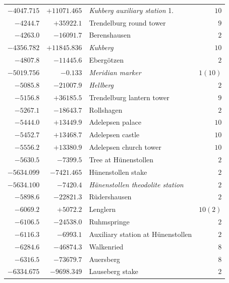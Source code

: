 \begin{center}
\begin{tabular}{r|r|p{170pt}|r}
\(-4047.715\)&\(+11071.465\)&\textit{Kuhberg auxiliary station} 1.&\(10\)\\
\(-4244.7\)&\(+35922.1\)&Trendelburg round tower&\(9\)\\
\(-4263.0\)&\(-16091.7\)&Berenshausen&\(2\)\\
\(-4356.782\)&\(+11845.836\)&\textit{Kuhberg}&\(10\)\\
\(-4807.8\)&\(-11445.6\)&Ebergötzen&\(2\)\\
\(-5019.756\)&\(-0.133\)&\textit{Meridian marker}&\(1(10)\)\\
\(-5085.8\)&\(-21007.9\)&\textit{Hellberg}&\(2\)\\
\(-5156.8\)&\(+36185.5\)&Trendelburg lantern tower&\(9\)\\
\(-5267.1\)&\(-18643.7\)&Rollshagen&\(2\)\\
\(-5444.0\)&\(+13449.9\)&Adelepsen palace&\(10\)\\
\(-5452.7\)&\(+13468.7\)&Adelepsen castle&\(10\)\\
\(-5556.2\)&\(+13380.9\)&Adelepsen church tower&\(10\)\\
\(-5630.5\)&\(-7399.5\)&Tree at Hünenstollen&\(2\)\\
\(-5634.099\)&\(-7421.465\)&Hünenstollen stake&\(2\)\\
\(-5634.100\)&\(-7420.4\)&\textit{Hänenstollen theodolite station}&\(2\)\\
\(-5898.6\)&\(-22821.3\)&Rüdershausen&\(2\)\\
\(-6069.2\)&\(+5072.2\)&Lenglern&\(10 (2)\)\\
\(-6106.5\)&\(-24538.0\)&Ruhmspringe&\(2\)\\
\(-6116.3\)&\(-6993.1\)&Auxiliary station at Hünenstollen&\(2\)\\
\(-6284.6\)&\(-46874.3\)&Walkenried&\(8\)\\
\(-6316.5\)&\(-73679.7\)&Auersberg&\(8\)\\
\(-6334.675\)&\(-9698.349\)&Lauseberg stake&\(2\)\\
\hline\end{tabular}\endgroup\end{center}
\clearpage
